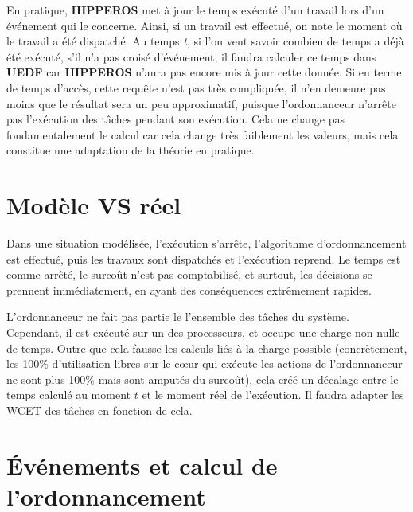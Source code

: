 		En pratique, \textbf{HIPPEROS} met à jour le temps exécuté d'un travail lors d'un événement qui le concerne. 
		Ainsi, si un travail est effectué, on note le moment où le travail a été dispatché.
		Au temps \textit{t}, si l'on veut savoir combien de temps a déjà été exécuté, 
		s'il n'a pas croisé d'événement, il faudra calculer ce temps dans \textbf{UEDF} 
		car \textbf{HIPPEROS} n'aura pas encore mis à jour cette donnée.\newline
		Si en terme de temps d'accès, cette requête n'est pas très compliquée, il n'en demeure pas moins 
		que le résultat sera un peu approximatif, puisque l'ordonnanceur n'arrête pas l'exécution des tâches pendant 
		son exécution. Cela ne change pas fondamentalement le calcul car cela change très faiblement les valeurs, 
		mais cela constitue une adaptation de la théorie en pratique.\newline

	\section{Modèle VS réel}
	
		Dans une situation modélisée, l'exécution s'arrête, l'algorithme d'ordonnancement est effectué, 
		puis les travaux sont dispatchés et l'exécution reprend.
		Le temps est comme arrêté, le surcoût n'est pas comptabilisé, et surtout, les décisions se prennent 
		immédiatement, en ayant des conséquences extrêmement rapides.
		\newline
		
		L'ordonnanceur ne fait pas partie le l'ensemble des tâches du système. Cependant, il est exécuté 
		sur un des processeurs, et occupe une charge non nulle de temps. Outre que cela fausse les calculs 
		liés à la charge possible (concrètement, les 100\% d'utilisation libres sur le cœur qui exécute 
		les actions de l'ordonnanceur ne sont plus 100\% mais sont amputés du surcoût), 
		cela créé un décalage entre le temps calculé au moment $t$ et le moment réel de l'exécution.
		Il faudra adapter les WCET des tâches en fonction de cela. \newline
		
	\section{Événements et calcul de l'ordonnancement}


